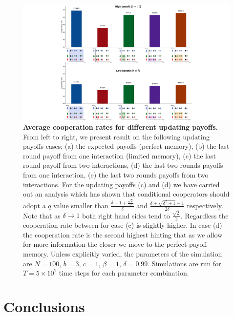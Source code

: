 \documentclass[11pt]{article}
\theoremstyle{plainCl1}
\theoremstyle{plainCl2}
\begin{document}
\begin{figure}[!htbp]
  \centering
  \includegraphics[width=\textwidth]{static/more_memory_summary_results.pdf}
  \caption{{\bf Average cooperation rates for different updating payoffs.}
  From left to right, we present result on the following updating payoffs cases;
  (a) the expected payoffs (perfect memory), (b) the last round payoff from one
  interaction (limited memory), (c) the last round payoff from two interactions,
  (d) the last two rounds payoffs from one interaction, (e) the last two rounds
  payoffs from two interactions. For the updating payoffs (c) and (d) we have
  carried out an analysis which has shown that conditional cooperators should
  adopt a \(q\) value smaller than $\frac{\delta - 1 +
  \frac{\sqrt{2}}{2}}{\delta}$ and $\frac{\delta + \sqrt{\delta^{2} + 1} - 1}{2 \delta}$
  respectively. Note that as \(\delta
  \rightarrow 1\) both right hand sides tend to \(\frac{\sqrt{2}}{2}\).
  Regardless the cooperation rate between for case (c) is slightly higher.
  In case (d) the cooperation rate is the second highest hinting that as we
  allow for more information the closer we move to the perfect payoff memory.
  Unless explicitly varied, the parameters of the simulation are
  $N\!=\!100$, $b\!=\!3$, $c\!=\!1$, $\beta\!=\!1$, $\delta\!=\!0.99$.
  Simulations are run for $T\!=\!5\times 10^7$ time steps for each parameter
  combination.}\label{fig:cooperation_rate_all_updating_payoffs}
\end{figure}

\section{Conclusions}\label{section:conclusions}
\end{document}
